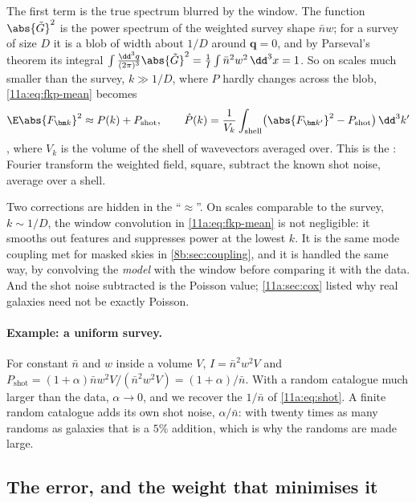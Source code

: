 The first term is the true spectrum blurred by the window. The function
$\abs{\tilde G}^2$ is the power spectrum of the weighted survey shape
$\bar nw$; for a survey of size $D$ it is a blob of width about $1/D$ around
$\bm q=0$, and by Parseval's theorem its integral
$\int\frac{\dd^3q}{(2\pi)^3}\abs{\tilde G}^2=\frac1I\int\bar n^2w^2\,\dd^3x=1$. So
on scales much smaller than the survey, $k\gg1/D$, where $P$ hardly changes across
the blob, \eqref{11a:eq:fkp-mean} becomes
\begin{equation}
  \E\abs{F_{\bm k}}^2\approx P(k)+P_{\mathrm{shot}},\qquad
  \hat P(k)=\frac{1}{V_k}\int_{\text{shell}}\bigl(\abs{F_{\bm k'}}^2-P_{\mathrm{shot}}\bigr)
  \,\dd^3k'
  \label{11a:eq:fkp-estimator}
\end{equation}
, where $V_k$ is the volume of the shell of
wavevectors averaged over. This is the : Fourier transform
the weighted field, square, subtract the known shot noise, average over a shell.

Two corrections are hidden in the ``$\approx$''. On scales comparable to the
survey, $k\sim1/D$, the window convolution in \eqref{11a:eq:fkp-mean} is not
negligible: it smooths out features and suppresses power at the lowest $k$. It is
the same mode coupling met for masked skies in \cref{8b:sec:coupling}, and it is
handled the same way, by convolving the \emph{model} with the window before
comparing it with the data. And the shot noise subtracted is the Poisson value;
\cref{11a:sec:cox} listed why real galaxies need not be exactly Poisson.

\paragraph{Example: a uniform survey.}
For constant $\bar n$ and $w$ inside a volume $V$, $I=\bar n^2w^2V$ and
$P_{\mathrm{shot}}=(1+\alpha)\bar nw^2V/(\bar n^2w^2V)=(1+\alpha)/\bar n$. With a
random catalogue much larger than the data, $\alpha\to0$, and we recover the
$1/\bar n$ of \eqref{11a:eq:shot}. A finite random catalogue adds its own shot
noise, $\alpha/\bar n$: with twenty times as many randoms as galaxies that is a
$5\%$ addition, which is why the randoms are made large.

\subsection{The error, and the weight that minimises it}
\label{11a:sec:fkp-weight}

